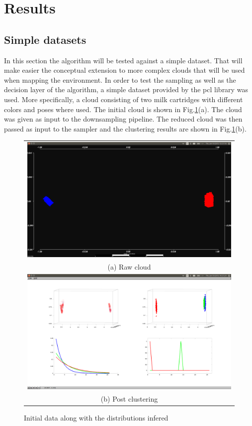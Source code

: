 \documentclass[twoside,hidelinks]{article}
\begin{document}
\section{Results}
\label{sec:results}

\subsection{Simple datasets}

In this section the algorithm will be tested against a simple dataset. That will make easier the conceptual extension to more complex clouds that will be used when mapping the environment. In order to test the sampling as well as the decision layer of the algorithm, a simple dataset provided by the pcl\cite{pcl} library was used. More specifically, a cloud consisting of two milk cartridges with different colors and poses where used. The initial cloud is shown in Fig.\ref{pcl:clust}(a). The cloud was given as input to the downsampling pipeline. The reduced cloud was then passed as input to the sampler and the clustering results are shown in Fig.\ref{pcl:clust}(b).

\begin{figure}
\begin{tabular}{c}
  \includegraphics[width=1\textwidth]{clusterings/initialData} \\
  (a) Raw cloud  \\
   \includegraphics[width=1\textwidth]{clusterings/colorcodedDistributions} \\
 (b) Post clustering \\[6pt]
\end{tabular}
\caption{Initial data along with the distributions infered}
  \label{pcl:clust}
\end{figure}
\end{document}
